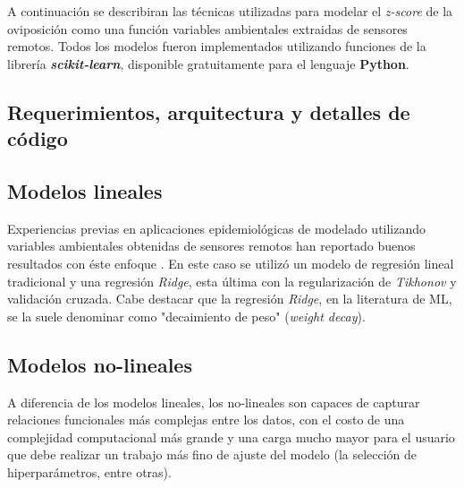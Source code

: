     \par A continuación se describiran las técnicas utilizadas para modelar
    el \textit{z-score} de la oviposición como una función variables ambientales
    extraidas de sensores remotos. Todos los modelos fueron implementados utilizando
    funciones de la librería \textbf{\textit{scikit-learn}}, disponible
    gratuitamente para el lenguaje \textbf{Python}.


    \subsection{Requerimientos, arquitectura y detalles de código}

    \subsection{Modelos lineales}

      \par Experiencias previas en aplicaciones epidemiológicas de
        modelado utilizando variables ambientales obtenidas de sensores
        remotos han reportado buenos resultados con éste
        enfoque \cite{akodon_modeling, multilinear_apli, modis_data}.
        En este caso se utilizó un modelo de regresión lineal tradicional y
        una regresión \textit{Ridge}, esta última con la regularización de
        \textit{Tikhonov} y validación cruzada. Cabe destacar que la
        regresión \textit{Ridge}, en la literatura de ML, se la suele denominar
        como "decaimiento de peso" (\textit{weight decay}).

  \subsection{Modelos no-lineales}

    \par A diferencia de los modelos lineales, los no-lineales son capaces de
      capturar relaciones funcionales más complejas entre los datos, con el costo
      de una complejidad computacional más grande y una carga mucho mayor para el
      usuario que debe realizar un trabajo más fino de ajuste del modelo (la
      selección de hiperparámetros, entre otras).

